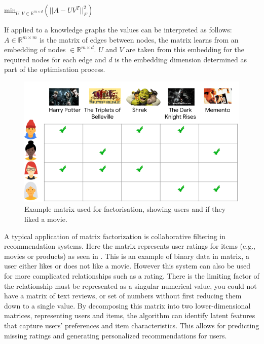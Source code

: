 \documentclass{l4proj}
\begin{document}
\begin{center}
    $\text{min}_{U,V\in \mathbb{R}^{m\times d}}\left (||A - UV^T||_{F}^{2}\right )$
\end{center}

If applied to a knowledge graphs the values can be interpreted as follows: $A \in \mathbb{R}^{m\times m}$ is the matrix of edges between nodes, the matrix learns from an embedding of nodes $ \in \mathbb{R}^{m\times d}$. $U$ and $V$ are taken from this embedding for the required nodes for each edge and $d$ is the embedding dimension determined as part of the optimisation process. 

\begin{figure}[h]
    \centering
    \includegraphics[width=\linewidth]{images/matrix_fact_example.png}
    \caption{Example matrix used for factorisation, showing users and if they liked a movie. \citep{matrix_fact}}
    \label{fig:matrix_fact_example}
\end{figure}

A typical application of matrix factorization is collaborative filtering in recommendation systems. Here the matrix represents user ratings for items (e.g., movies or products) as seen in . This is an example of binary data in matrix, a user either likes or does not like a movie. However this system can also be used for more complicated relationships such as a rating. There is the limiting factor of the relationship must be represented as a singular numerical value, you could not have a matrix of text reviews, or set of numbers without first reducing them down to a single value. By decomposing this matrix into two lower-dimensional matrices, representing users and items, the algorithm can identify latent features that capture users' preferences and item characteristics. This allows for predicting missing ratings and generating personalized recommendations for users. \\
\end{document}
